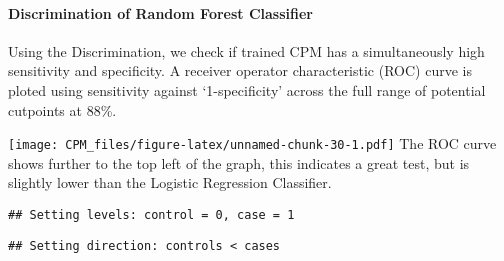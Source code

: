 \documentclass[]{article}
\newenvironment{Shaded}{\begin{snugshade}}{\end{snugshade}}
\newcommand{\CommentTok}[1]{\textcolor[rgb]{0.56,0.35,0.01}{\textit{#1}}}
\newcommand{\DataTypeTok}[1]{\textcolor[rgb]{0.13,0.29,0.53}{#1}}
\newcommand{\DecValTok}[1]{\textcolor[rgb]{0.00,0.00,0.81}{#1}}
\newcommand{\FloatTok}[1]{\textcolor[rgb]{0.00,0.00,0.81}{#1}}
\newcommand{\KeywordTok}[1]{\textcolor[rgb]{0.13,0.29,0.53}{\textbf{#1}}}
\newcommand{\NormalTok}[1]{#1}
\newcommand{\OperatorTok}[1]{\textcolor[rgb]{0.81,0.36,0.00}{\textbf{#1}}}
\newcommand{\OtherTok}[1]{\textcolor[rgb]{0.56,0.35,0.01}{#1}}
\newcommand{\StringTok}[1]{\textcolor[rgb]{0.31,0.60,0.02}{#1}}
\let\oldparagraph\paragraph
\renewcommand{\paragraph}[1]{\oldparagraph{#1}\mbox{}}
\begin{document}
\hypertarget{discrimination-of-random-forest-classifier}{%
\paragraph{Discrimination of Random Forest
Classifier}\label{discrimination-of-random-forest-classifier}}

Using the Discrimination, we check if trained CPM has a simultaneously
high sensitivity and specificity. A receiver operator characteristic
(ROC) curve is ploted using sensitivity against `1-specificity' across
the full range of potential cutpoints at 88\%.

\begin{Shaded}
\end{Shaded}

\texttt{[image: CPM\_files/figure-latex/unnamed-chunk-30-1.pdf]} The ROC
curve shows further to the top left of the graph, this indicates a great
test, but is slightly lower than the Logistic Regression Classifier.

\begin{Shaded}
\end{Shaded}

\begin{verbatim}
## Setting levels: control = 0, case = 1
\end{verbatim}

\begin{verbatim}
## Setting direction: controls < cases
\end{verbatim}
\end{document}
